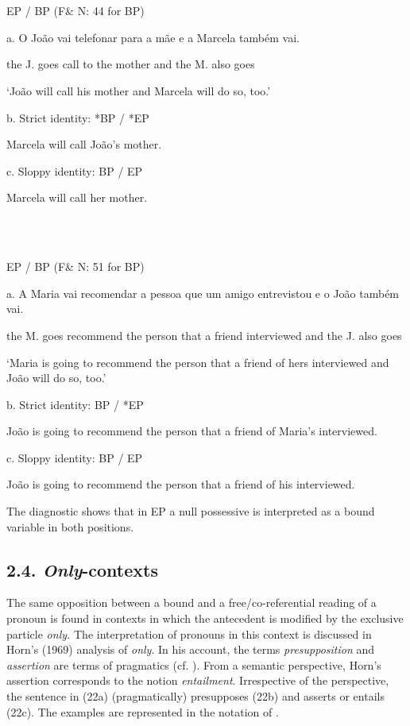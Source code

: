 \documentclass[output=paper]{langsci/langscibook}
\begin{document}
\ea%
    \label{ex:key:20}
    \gll\\
        \\
    \glt
    \z

          EP / BP (F\& N: 44 for BP)

  a.  O João vai telefonar para a mãe e a Marcela também vai.

the J. goes call to the mother and the M. also goes  

‘João will call his mother and Marcela will do so, too.’

b.  Strict identity: *BP / *EP

Marcela will call João’s mother.

c.  Sloppy identity: BP / EP

Marcela will call her mother.

\ea%
    \label{ex:key:21}
    \gll\\
        \\
    \glt
    \z

          EP / BP (F\& N: 51 for BP)

a.  A Maria vai recomendar a pessoa que um amigo entrevistou e o João também vai.

the M. goes recommend the person that a friend interviewed and the J. also goes

‘Maria is going to recommend the person that a friend of hers interviewed and João will do so, too.’

b.  Strict identity: BP / *EP

João is going to recommend the person that a friend of Maria’s interviewed.

c.  Sloppy identity: BP / EP

João is going to recommend the person that a friend of his interviewed. 

The diagnostic shows that in EP a null possessive is interpreted as a bound variable in both positions.

\subsection{ 2.4. \textit{Only}{}-contexts}

The same opposition between a bound and a free/co-referential reading of a pronoun is found in contexts in which the antecedent is modified by the exclusive particle \textit{only.} The interpretation of pronouns in this context is discussed in Horn’s (1969) analysis of \textit{only}. In his account, the terms \textit{presupposition} and \textit{assertion} are terms of pragmatics (cf. \citealt{Pagin2016}). From a semantic perspective, Horn’s assertion corresponds to the notion \textit{entailment}. Irrespective of the perspective, the sentence in (22a) (pragmatically) presupposes (22b) and asserts or entails (22c). The examples are represented in the notation of \citet{Horn1969}. 
\end{document}
